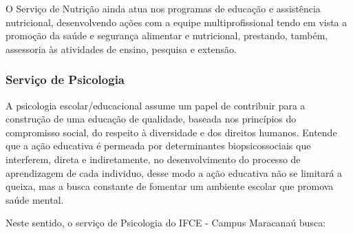 \documentclass{paper}
\begin{document}
O Serviço de Nutrição ainda atua nos programas de educação e assistência nutricional, desenvolvendo ações com a equipe multiprofissional tendo em vista a promoção da saúde e segurança alimentar e nutricional, prestando, também, assessoria às atividades de ensino, pesquisa e extensão.


\subsubsection{Serviço de Psicologia} 

A psicologia escolar/educacional assume um papel de contribuir para a construção de uma educação de qualidade, baseada nos princípios do compromisso social, do respeito à diversidade e dos direitos humanos. Entende que a ação educativa é permeada por determinantes biopsicossociais que interferem, direta e indiretamente, no desenvolvimento do processo de aprendizagem de cada individuo, desse modo a ação educativa não se limitará a queixa, mas a busca constante de fomentar um ambiente escolar que promova saúde mental.

Neste sentido, o serviço de Psicologia do IFCE - Campus Maracanaú busca:
\end{document}
